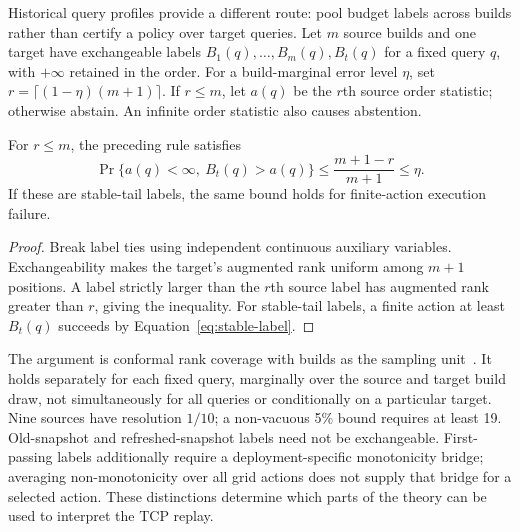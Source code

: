 Historical query profiles provide a different route: pool budget labels across builds rather than certify a policy over target queries. Let $m$ source builds and one target have exchangeable labels $B_1(q),\ldots,B_m(q),B_t(q)$ for a fixed query $q$, with $+\infty$ retained in the order. For a build-marginal error level $\eta$, set $r=\lceil(1-\eta)(m+1)\rceil$. If $r\le m$, let $a(q)$ be the $r$th source order statistic; otherwise abstain. An infinite order statistic also causes abstention.

\begin{proposition}
\label{prop:pooling}
For $r\le m$, the preceding rule satisfies
\begin{equation}
 \Pr\{a(q)<\infty,\ B_t(q)>a(q)\}
 \le\frac{m+1-r}{m+1}\le\eta.
 \label{eq:pooling}
\end{equation}
If these are stable-tail labels, the same bound holds for finite-action execution failure.
\end{proposition}
\begin{proof}
Break label ties using independent continuous auxiliary variables. Exchangeability makes the target's augmented rank uniform among $m+1$ positions. A label strictly larger than the $r$th source label has augmented rank greater than $r$, giving the inequality. For stable-tail labels, a finite action at least $B_t(q)$ succeeds by Equation~\eqref{eq:stable-label}.
\end{proof}

The argument is conformal rank coverage with builds as the sampling unit~\cite{angelopoulos2023conformal}. It holds separately for each fixed query, marginally over the source and target build draw, not simultaneously for all queries or conditionally on a particular target. Nine sources have resolution $1/10$; a non-vacuous 5\% bound requires at least 19. Old-snapshot and refreshed-snapshot labels need not be exchangeable. First-passing labels additionally require a deployment-specific monotonicity bridge; averaging non-monotonicity over all grid actions does not supply that bridge for a selected action. These distinctions determine which parts of the theory can be used to interpret the TCP replay.
